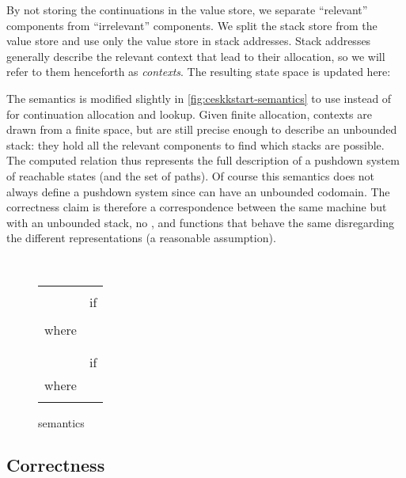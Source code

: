 By not storing the continuations in the value store, we separate ``relevant'' components from ``irrelevant'' components.
We split the stack store from the value store and use only the value store in stack addresses.
Stack addresses generally describe the relevant context that lead to their allocation, so we will refer to them henceforth as \emph{contexts}.
The resulting state space is updated here:
  

The semantics is modified slightly in \autoref{fig:ceskkstart-semantics} to use  instead of  for continuation allocation and lookup.
Given finite allocation, contexts are drawn from a finite space, but are still precise enough to describe an unbounded stack: they hold all the relevant components to find which stacks are possible.
The computed  relation thus represents the full description of a pushdown system of reachable states (and the set of paths).
Of course this semantics does not always define a pushdown system since  can have an unbounded codomain.
The correctness claim is therefore a correspondence between the same machine but with an unbounded stack, no , and  functions that behave the same disregarding the different representations (a reasonable assumption).

\begin{figure}
  \centering
   \quad  \quad  \\
  \begin{tabular}{r|l}
    \hline\vspace{-3mm}\\
    
    &
     if 
    \\

    &
     \\
    where &  \\
          & 
    \\

    &
    
    \\

    &
     if  \\
    where &  \\
          & 
  \end{tabular}
  \caption{ semantics}
  \label{fig:ceskkstart-semantics}
\end{figure}

\subsection{Correctness}

